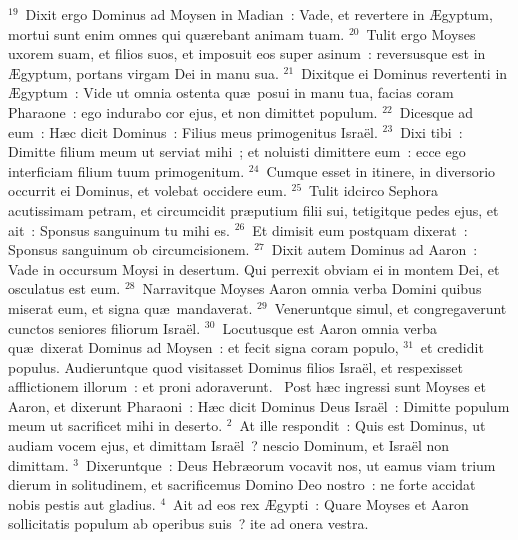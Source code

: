 ${}^{19}$~Dixit ergo Dominus ad Moysen in Madian~: Vade, et revertere in \AE gyptum, mortui sunt enim omnes qui qu\ae rebant animam tuam.
${}^{20}$~Tulit ergo Moyses uxorem suam, et filios suos, et imposuit eos super asinum~: reversusque est in \AE gyptum, portans virgam Dei in manu sua.
${}^{21}$~Dixitque ei Dominus revertenti in \AE gyptum~: Vide ut omnia ostenta qu\ae\ posui in manu tua, facias coram Pharaone~: ego indurabo cor ejus, et non dimittet populum.
${}^{22}$~Dicesque ad eum~: H\ae c dicit Dominus~: Filius meus primogenitus Isra\"el.
${}^{23}$~Dixi tibi~: Dimitte filium meum ut serviat mihi~; et noluisti dimittere eum~: ecce ego interficiam filium tuum primogenitum.
${}^{24}$~Cumque esset in itinere, in diversorio occurrit ei Dominus, et volebat occidere eum.
${}^{25}$~Tulit idcirco Sephora acutissimam petram, et circumcidit pr\ae putium filii sui, tetigitque pedes ejus, et ait~: Sponsus sanguinum tu mihi es.
${}^{26}$~Et dimisit eum postquam dixerat~: Sponsus sanguinum ob circumcisionem.
${}^{27}$~Dixit autem Dominus ad Aaron~: Vade in occursum Moysi in desertum. Qui perrexit obviam ei in montem Dei, et osculatus est eum.
${}^{28}$~Narravitque Moyses Aaron omnia verba Domini quibus miserat eum, et signa qu\ae\ mandaverat.
${}^{29}$~Veneruntque simul, et congregaverunt cunctos seniores filiorum Isra\"el.
${}^{30}$~Locutusque est Aaron omnia verba qu\ae\ dixerat Dominus ad Moysen~: et fecit signa coram populo,
${}^{31}$~et credidit populus. Audieruntque quod visitasset Dominus filios Isra\"el, et respexisset afflictionem illorum~: et proni adoraverunt.
~Post h\ae c ingressi sunt Moyses et Aaron, et dixerunt Pharaoni~: H\ae c dicit Dominus Deus Isra\"el~: Dimitte populum meum ut sacrificet mihi in deserto.
${}^{2}$~At ille respondit~: Quis est Dominus, ut audiam vocem ejus, et dimittam Isra\"el~? nescio Dominum, et Isra\"el non dimittam.
${}^{3}$~Dixeruntque~: Deus Hebr\ae orum vocavit nos, ut eamus viam trium dierum in solitudinem, et sacrificemus Domino Deo nostro~: ne forte accidat nobis pestis aut gladius.
${}^{4}$~Ait ad eos rex \AE gypti~: Quare Moyses et Aaron sollicitatis populum ab operibus suis~? ite ad onera vestra.


